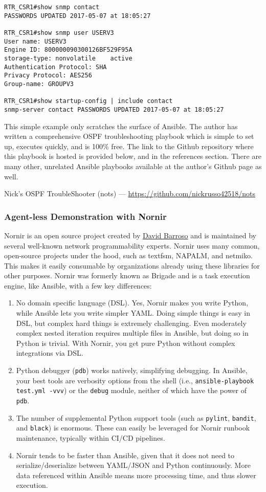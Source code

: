 \begin{verbatim}
RTR_CSR1#show snmp contact
PASSWORDS UPDATED 2017-05-07 at 18:05:27

RTR_CSR1#show snmp user USERV3
User name: USERV3
Engine ID: 800000090300126BF529F95A
storage-type: nonvolatile	 active
Authentication Protocol: SHA
Privacy Protocol: AES256
Group-name: GROUPV3

RTR_CSR1#show startup-config | include contact
snmp-server contact PASSWORDS UPDATED 2017-05-07 at 18:05:27
\end{verbatim}

This simple example only scratches the surface of Ansible. The author has
written a comprehensive OSPF troubleshooting playbook which is simple to set
up, executes quickly, and is 100\% free. The link to the Github repository
where this playbook is hosted is provided below, and in the references
section. There are many other, unrelated Ansible playbooks available at the
author's Github page as well.

Nick's OSPF TroubleShooter (nots) --- \url{https://github.com/nickrusso42518/nots}

\subsubsection{Agent-less Demonstration with Nornir}
Nornir is an open source project created by
\href{https://twitter.com/dbarrosop/}{David Barroso} and is maintained by
several well-known network programmability experts. Nornir uses many common,
open-source projects under the hood, such as textfsm, NAPALM, and netmiko.
This makes it easily consumable by organizations already using these libraries
for other purposes.  Nornir was formerly known as Brigade and is a task
execution engine, like Ansible, with a few key differences:

\begin{enumerate}
  \item	No domain specific language (DSL). Yes, Nornir makes you write Python,
  while Ansible lets you write simpler YAML\@. Doing simple things is easy in
  DSL, but complex hard things is extremely challenging. Even moderately
  complex nested iteration requires multiple files in Ansible, but doing so in
  Python is trivial. With Nornir, you get pure Python without complex
  integrations via DSL\@.
  \item	Python debugger (\verb|pdb|) works natively, simplifying debugging. In
  Ansible, your best tools are verbosity options from the shell (i.e.,
  \verb|ansible-playbook test.yml -vvv|) or the \verb|debug| module, neither
  of which have the power of \verb|pdb|.
  \item	The number of supplemental Python support tools (such as
  \verb|pylint|, \verb|bandit|, and \verb|black|) is enormous. These can
  easily be leveraged for Nornir runbook maintenance, typically within CI/CD pipelines.
  \item	Nornir tends to be faster than Ansible, given that it does not need to
  serialize/deserialize between YAML/JSON and Python continuously. More data
  referenced within Ansible means more processing time, and thus slower execution.
\end{enumerate}

